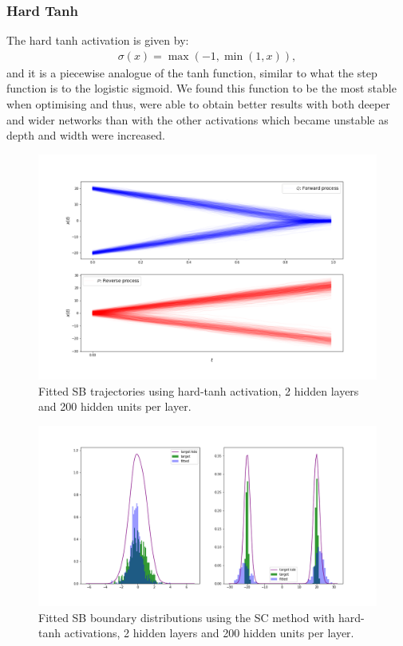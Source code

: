 \documentclass[a4paper,12pt,twoside,openright]{report}
\theoremstyle{definition}
\begin{document}
\subsubsection{Hard Tanh}

The hard tanh activation is given by:
\begin{align*}
    \sigma(x) = \max(-1, \min(1, x)),
\end{align*}
and it is a piecewise analogue of the tanh function, similar to what the step function is to the logistic sigmoid. We found this function to be the most stable when optimising and thus, were able to obtain better results with both deeper and wider networks than with the other activations which became unstable as depth and width were increased.
\begin{figure}
    \centering
    \includegraphics[scale=0.4,trim={2.3cm 1cm 2.5cm 0}, clip]{images/Control/hard_tanh_200_200__succesfl_bimodal_trajectories.png}
    \caption{ Fitted SB  trajectories using hard-tanh activation, 2 hidden layers and 200 hidden units per layer.}
    \label{fig:trajectoriesbimodtanhnnhard}
\end{figure}
\begin{figure}
    \centering
    \includegraphics[scale=0.4,trim={2.3cm 1cm 2.5cm 0}, clip]{images/Control/hard_tanh_200_200_succesfl_bimodal_boundaires.png}
    \caption{ Fitted SB  boundary distributions using the SC method with hard-tanh activations, 2 hidden layers and 200 hidden units per layer.}
    \label{fig:boundsbimodtanhnnhard}
\end{figure}
\end{document}
